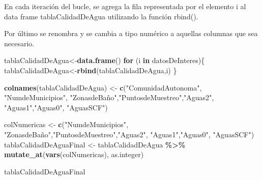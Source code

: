 \documentclass[
]{article}
\newenvironment{Shaded}{\begin{snugshade}}{\end{snugshade}}
\newcommand{\ControlFlowTok}[1]{\textcolor[rgb]{0.13,0.29,0.53}{\textbf{#1}}}
\newcommand{\FunctionTok}[1]{\textcolor[rgb]{0.13,0.29,0.53}{\textbf{#1}}}
\newcommand{\NormalTok}[1]{#1}
\newcommand{\OtherTok}[1]{\textcolor[rgb]{0.56,0.35,0.01}{#1}}
\newcommand{\SpecialCharTok}[1]{\textcolor[rgb]{0.81,0.36,0.00}{\textbf{#1}}}
\newcommand{\StringTok}[1]{\textcolor[rgb]{0.31,0.60,0.02}{#1}}
\begin{document}
En cada iteración del bucle, se agrega la fila representada por el
elemento i al data frame tablaCalidadDeAgua utilizando la función
rbind().

Por último se renombra y se cambia a tipo numérico a aquellas columnas
que sea necesario.

\begin{Shaded}
\begin{Highlighting}[]
\NormalTok{tablaCalidadDeAgua}\OtherTok{\textless{}{-}}\FunctionTok{data.frame}\NormalTok{()}
\ControlFlowTok{for}\NormalTok{ (i }\ControlFlowTok{in}\NormalTok{ datosDeInteres)\{}
\NormalTok{  tablaCalidadDeAgua}\OtherTok{\textless{}{-}}\FunctionTok{rbind}\NormalTok{(tablaCalidadDeAgua,i)}
\NormalTok{\}}

\FunctionTok{colnames}\NormalTok{(tablaCalidadDeAgua) }\OtherTok{\textless{}{-}} \FunctionTok{c}\NormalTok{(}\StringTok{"ComunidadAutonoma"}\NormalTok{, }\StringTok{"NumdeMunicipios"}\NormalTok{, }\StringTok{"ZonasdeBaño"}\NormalTok{,}\StringTok{"PuntosdeMuestreo"}\NormalTok{,}\StringTok{"Aguas2"}\NormalTok{, }\StringTok{"Aguas1"}\NormalTok{,}\StringTok{"Aguas0"}\NormalTok{, }\StringTok{"AguasSCF"}\NormalTok{)}

\NormalTok{colNumericas }\OtherTok{\textless{}{-}} \FunctionTok{c}\NormalTok{(}\StringTok{"NumdeMunicipios"}\NormalTok{, }\StringTok{"ZonasdeBaño"}\NormalTok{,}\StringTok{"PuntosdeMuestreo"}\NormalTok{,}\StringTok{"Aguas2"}\NormalTok{, }\StringTok{"Aguas1"}\NormalTok{,}\StringTok{"Aguas0"}\NormalTok{, }\StringTok{"AguasSCF"}\NormalTok{)}
\NormalTok{tablaCalidadDeAguaFinal }\OtherTok{\textless{}{-}}\NormalTok{ tablaCalidadDeAgua }\SpecialCharTok{\%\textgreater{}\%}
  \FunctionTok{mutate\_at}\NormalTok{(}\FunctionTok{vars}\NormalTok{(colNumericas), as.integer)}
\end{Highlighting}
\end{Shaded}

\begin{Shaded}
\begin{Highlighting}[]
\NormalTok{tablaCalidadDeAguaFinal}
\end{Highlighting}
\end{Shaded}
\end{document}
